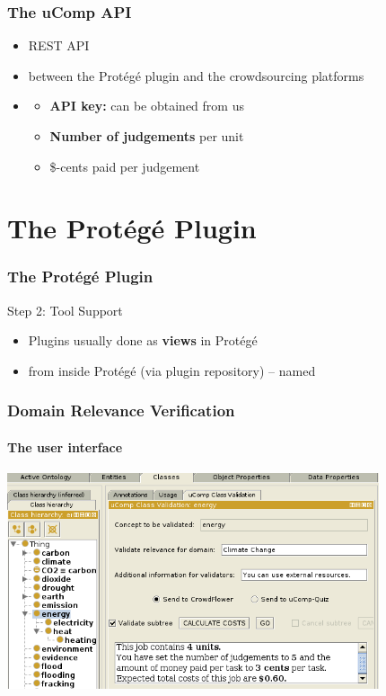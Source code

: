 \documentclass{beamer}
\begin{document}
\begin{frame}
  \frametitle{The uComp API}
  \begin{itemize}
        \item REST API 
        \item {} between the Prot\'eg\'e plugin and the crowdsourcing platforms

        \item {}
          \begin{itemize}
                \item \textbf{API key:} can be obtained from us
                \item \textbf{Number of judgements} per unit 
                \item \$-cents paid per judgement 
          \end{itemize}

  \end{itemize}
\end{frame}



\section{The Prot\'eg\'e Plugin}

\begin{frame}
  \frametitle{The Prot\'eg\'e Plugin}
    \huge Step 2: Tool Support \\ \large
    \vspace{0.5cm}
 
  \begin{itemize}
        \item Plugins usually done as \textbf{views} in Prot\'eg\'e
    \vspace{0.5cm}
    \vspace{0.5cm}
        \item {} from inside Prot\'eg\'e (via plugin repository) -- named 
  \end{itemize}
\end{frame}


\begin{frame}
  \frametitle{Domain Relevance Verification}
  \framesubtitle{The user interface}
   \center
  \includegraphics[height=2.5in]{images/cc_class_new}
\end{frame}
\end{document}
